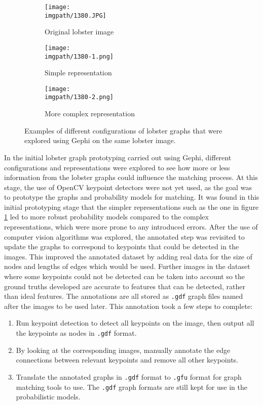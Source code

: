 \begin{figure}[H]
\centering
	\begin{subfigure}{0.31\textwidth}
		\texttt{[image: \\imgpath/1380.JPG]}
		\caption{Original lobster image}
	\end{subfigure}
	\hspace*{\fill}
	\begin{subfigure}{0.31\textwidth}
		\texttt{[image: \\imgpath/1380-1.png]}
		\caption{Simple representation}
                \label{fig:gephi-simple}
	\end{subfigure}
	\hspace*{\fill}
	\begin{subfigure}{0.31\textwidth}
		\texttt{[image: \\imgpath/1380-2.png]}
		\caption{More complex representation}
                \label{fig:gephi-complex}
	\end{subfigure}
\caption{Examples of different configurations of lobster graphs that were explored using Gephi on the same lobster image.}
\end{figure}
\noindent
In the initial lobster graph prototyping carried out using Gephi, different configurations and representations were explored to see how more or less information from the lobster graphs could influence the matching process. At this stage, the use of OpenCV keypoint detectors were not yet used, as the goal was to prototype the graphs and probability models for matching. It was found in this initial prototyping stage that the simpler representations such as the one in figure \ref{fig:gephi-simple} led to more robust probability models compared to the complex representations, which were more prone to any introduced errors.
\n
After the use of computer vision algorithms was explored, the annotated step was revisited to update the graphs to correspond to keypoints that could be detected in the images. This improved the annotated dataset by adding real data for the size of nodes and lengths of edges which would be used. Further images in the dataset where some keypoints could not be detected can be taken into account so the ground truths developed are accurate to features that can be detected, rather than ideal features. The annotations are all stored as \texttt{.gdf} graph files named after the images to be used later. This annotation took a few steps to complete:
\begin{enumerate}
\item Run keypoint detection to detect all keypoints on the image, then output all the keypoints as nodes in \texttt{.gdf} format.
\item By looking at the corresponding images, manually annotate the edge connections between relevant keypoints and remove all other keypoints.
\item Translate the annotated graphs in \texttt{.gdf} format to \texttt{.gfu} format for graph matching tools to use. The \texttt{.gdf} graph formats are still kept for use in the probabilistic models.
\end{enumerate}

